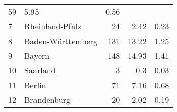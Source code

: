 \begin{longtable}{lXrrr}
       \num{59} &
       \num[round-mode=places,round-precision=2]{5.95} &
         \num[round-mode=places,round-precision=2]{0.56} \\

     7 &
     \multicolumn{1}{X}{ Rheinland-Pfalz   } &


       \num{24} &
       \num[round-mode=places,round-precision=2]{2.42} &
         \num[round-mode=places,round-precision=2]{0.23} \\

     8 &
     \multicolumn{1}{X}{ Baden-Württemberg   } &


       \num{131} &
       \num[round-mode=places,round-precision=2]{13.22} &
         \num[round-mode=places,round-precision=2]{1.25} \\

     9 &
     \multicolumn{1}{X}{ Bayern   } &


       \num{148} &
       \num[round-mode=places,round-precision=2]{14.93} &
         \num[round-mode=places,round-precision=2]{1.41} \\

     10 &
     \multicolumn{1}{X}{ Saarland   } &


       \num{3} &
       \num[round-mode=places,round-precision=2]{0.3} &
         \num[round-mode=places,round-precision=2]{0.03} \\

     11 &
     \multicolumn{1}{X}{ Berlin   } &


       \num{71} &
       \num[round-mode=places,round-precision=2]{7.16} &
         \num[round-mode=places,round-precision=2]{0.68} \\

     12 &
     \multicolumn{1}{X}{ Brandenburg   } &


       \num{20} &
       \num[round-mode=places,round-precision=2]{2.02} &
         \num[round-mode=places,round-precision=2]{0.19} \\


\end{longtable}
